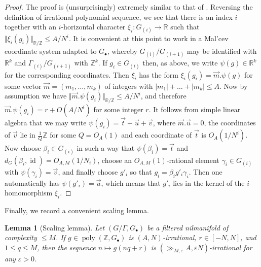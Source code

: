 \documentclass[11pt,reqno]{amsart}
\numberwithin{equation}{section}
\theoremstyle{plain}
\newtheorem{lemma}[subsection]{Lemma}
\theoremstyle{definition}
\renewcommand{\leq}{\leqslant}
\newcommand\Z{\mathbb{Z}}
\newcommand\R{\mathbb{R}}
\newcommand\1{{\bf 1}}
\newcommand\2{{\bf 2}}
\newcommand\eps{\varepsilon}
\newcommand\poly{\operatorname{poly}}
\newcommand\id{\operatorname{id}}
\begin{document}
\begin{proof} The proof is (unsurprisingly) extremely similar to that of \cite[Lemma 7.9]{green-tao-nilratner}. Reversing the definition of irrational polynomial sequence, we see that there is an index $i$ together with an $i$-horizontal character $\xi_i : G_{(i)} \rightarrow \R$ such that $\Vert \xi_i (g_i) \Vert_{\R/\Z} \leq A/N^i$. It is convenient at this point to work in a Mal'cev coordinate system adapted to $G_{\bullet}$, whereby $G_{(i)}/G_{(i+1)}$ may be identified with $\R^k$ and $\Gamma_{(i)}/G_{(i+1)}$ with $\Z^k$. If $g_i \in G_{(i)}$ then, as above, we write $\psi(g) \in \R^k$ for the corresponding coordinates. Then $\xi_i$ has the form $\xi_i (g_i) = \vec{m} . \psi(g)$ for some vector $\vec{m} = (m_1,\dots,m_k)$ of integers with $|m_1| + \dots + |m_k| \leq A$. Now by assumption we have $\Vert \vec{m} . \psi(g_i) \Vert_{\R/\Z} \leq A/N^i$, and therefore $\vec{m} . \psi(g_i) = r + O(A/N^i)$ for some integer $r$. It follows from simple linear algebra that we may write $\psi(g_i) = \vec{t} + \vec{u} + \vec{v}$, where $\vec{m} . \vec{u} = 0$, the coordinates of $\vec{v}$ lie in $\frac{1}{Q}\Z$ for some $Q = O_{A}(1)$ and each coordinate of $\vec{t}$ is $O_{A}(1/N^i)$. Now choose $\beta_i \in G_{(i)}$ in such a way that $\psi(\beta_i) = \vec{t}$ and $d_G(\beta_i, \id) = O_{A,M}(1/N_i)$, choose an $O_{A,M}(1)$-rational element $\gamma_i \in G_{(i)}$ with $\psi(\gamma_i) = \vec{v}$, and finally choose $g'_i$ so that $g_i = \beta_i g'_i \gamma_i$. Then one automatically has $\psi(g'_i) = \vec{u}$, which means that $g'_i$ lies in the kernel of the $i$-homomorphism $\xi_i$.\end{proof}

Finally, we record a convenient scaling lemma.

\begin{lemma}[Scaling lemma]\label{scaling-lemma}  Let $(G/\Gamma,G_\bullet)$ be a filtered nilmanifold of complexity $\leq M$.
If $g \in \poly(\Z,G_\bullet)$ is $(A,N)$-irrational, $r \in [-N,N]$, and $1 \leq q \leq M$, then the sequence $n \mapsto g(nq+r)$ is $(\gg_{M,\eps} A, \eps N)$-irrational for any $\eps > 0$.
\end{lemma}
\end{document}

